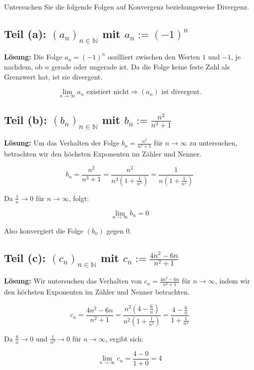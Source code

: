 \documentclass[11pt]{article}
\begin{document}
Untersuchen Sie die folgende Folgen auf Konvergenz beziehungsweise Divergenz.

\subsection*{Teil (a): \( (a_n)_{n \in \mathbb{N}} \) mit \( a_n := (-1)^n \)}

\textbf{Lösung:} Die Folge \( a_n = (-1)^n \) oszilliert zwischen den Werten \( 1 \) und \( -1 \), je nachdem, ob \( n \) gerade oder ungerade ist. Da die Folge keine feste Zahl als Grenzwert hat, ist sie divergent.

\[
\lim_{n \to \infty} a_n \text{ existiert nicht} \Rightarrow (a_n) \text{ ist divergent.}
\]

\subsection*{Teil (b): \( (b_n)_{n \in \mathbb{N}} \) mit \( b_n := \frac{n^2}{n^3 + 1} \)}

\textbf{Lösung:} Um das Verhalten der Folge \( b_n = \frac{n^2}{n^3 + 1} \) für \( n \to \infty \) zu untersuchen, betrachten wir den höchsten Exponenten im Zähler und Nenner.

\[
b_n = \frac{n^2}{n^3 + 1} = \frac{n^2}{n^3 \left(1 + \frac{1}{n^3}\right)} = \frac{1}{n \left(1 + \frac{1}{n^3}\right)}
\]

Da \( \frac{1}{n} \to 0 \) für \( n \to \infty \), folgt:

\[
\lim_{n \to \infty} b_n = 0
\]

Also konvergiert die Folge \( (b_n) \) gegen 0.

\subsection*{Teil (c): \( (c_n)_{n \in \mathbb{N}} \) mit \( c_n := \frac{4n^2 - 6n}{n^2 + 1} \)}

\textbf{Lösung:} Wir untersuchen das Verhalten von \( c_n = \frac{4n^2 - 6n}{n^2 + 1} \) für \( n \to \infty \), indem wir den höchsten Exponenten im Zähler und Nenner betrachten.

\[
c_n = \frac{4n^2 - 6n}{n^2 + 1} = \frac{n^2 (4 - \frac{6}{n})}{n^2 (1 + \frac{1}{n^2})} = \frac{4 - \frac{6}{n}}{1 + \frac{1}{n^2}}
\]

Da \( \frac{6}{n} \to 0 \) und \( \frac{1}{n^2} \to 0 \) für \( n \to \infty \), ergibt sich:

\[
\lim_{n \to \infty} c_n = \frac{4 - 0}{1 + 0} = 4
\]
\end{document}
